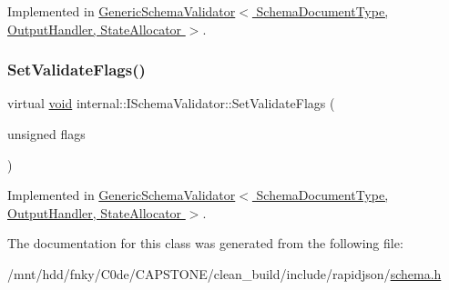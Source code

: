 Implemented in \hyperlink{classGenericSchemaValidator_a8ebda4da3d8b1fc41e57f15dd62e8f19}{Generic\+Schema\+Validator$<$ Schema\+Document\+Type, Output\+Handler, State\+Allocator $>$}.

\mbox{\label{classinternal_1_1ISchemaValidator_a29b7df0935c87630bbb70c1e19d4c722}} 
\subsubsection{\texorpdfstring{Set\+Validate\+Flags()}{SetValidateFlags()}}
{\footnotesize\ttfamily virtual \hyperlink{imgui__impl__opengl3__loader_8h_ac668e7cffd9e2e9cfee428b9b2f34fa7}{void} internal\+::\+I\+Schema\+Validator\+::\+Set\+Validate\+Flags (\begin{DoxyParamCaption}\item[{unsigned}]{flags }\end{DoxyParamCaption})\hspace{0.3cm}{\ttfamily [pure virtual]}}



Implemented in \hyperlink{classGenericSchemaValidator_af4840dac2410bcfe73912c30eb95b875}{Generic\+Schema\+Validator$<$ Schema\+Document\+Type, Output\+Handler, State\+Allocator $>$}.



The documentation for this class was generated from the following file\+:\begin{DoxyCompactItemize}
\item 
/mnt/hdd/fnky/\+C0de/\+C\+A\+P\+S\+T\+O\+N\+E/clean\+\_\+build/include/rapidjson/\hyperlink{schema_8h}{schema.\+h}\end{DoxyCompactItemize}
